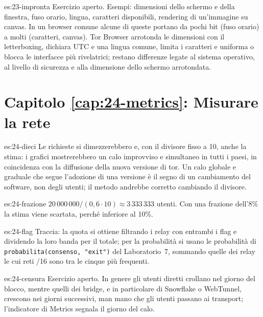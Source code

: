 \begin{soluzione}{es:23-impronta}
Esercizio aperto. Esempi: dimensioni dello schermo e della finestra, fuso orario, lingua, caratteri disponibili, rendering di un'immagine su canvas. In un browser comune alcune di queste portano da pochi bit (fuso orario) a molti (caratteri, canvas). Tor Browser arrotonda le dimensioni con il letterboxing, dichiara UTC e una lingua comune, limita i caratteri e uniforma o blocca le interfacce più rivelatrici; restano differenze legate al sistema operativo, al livello di sicurezza e alla dimensione dello schermo arrotondata.
\end{soluzione}

\section*{Capitolo \ref{cap:24-metrics}: Misurare la rete}

\begin{soluzione}{es:24-dieci}
Le richieste si dimezzerebbero e, con il divisore fisso a 10, anche la stima: i grafici mostrerebbero un calo improvviso e simultaneo in tutti i paesi, in coincidenza con la diffusione della nuova versione di tor. Un calo globale e graduale che segue l'adozione di una versione è il segno di un cambiamento del software, non degli utenti; il metodo andrebbe corretto cambiando il divisore.
\end{soluzione}

\begin{soluzione}{es:24-frazione}
$20\,000\,000 / (0{,}6 \cdot 10) \approx 3\,333\,333$ utenti. Con una frazione dell'8\% la stima viene scartata, perché inferiore al 10\%.
\end{soluzione}

\begin{soluzione}{es:24-flag}
Traccia: la quota si ottiene filtrando i relay con entrambi i flag e dividendo la loro banda per il totale; per la probabilità si usano le probabilità di \texttt{probabilita(consenso, "exit")} del Laboratorio~7, sommando quelle dei relay le cui reti /16 sono tra le cinque più frequenti.
\end{soluzione}

\begin{soluzione}{es:24-censura}
Esercizio aperto. In genere gli utenti diretti crollano nel giorno del blocco, mentre quelli dei bridge, e in particolare di Snowflake o WebTunnel, crescono nei giorni successivi, man mano che gli utenti passano ai transport; l'indicatore di Metrics segnala il giorno del calo.
\end{soluzione}

